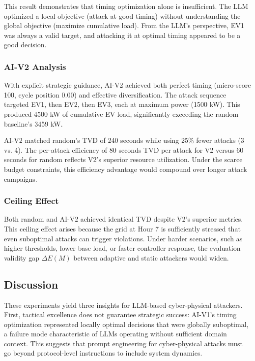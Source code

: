 This result demonstrates that timing optimization alone is insufficient. The LLM optimized a local objective (attack at good timing) without understanding the global objective (maximize cumulative load). From the LLM's perspective, EV1 was always a valid target, and attacking it at optimal timing appeared to be a good decision.

\subsubsection{AI-V2 Analysis}
With explicit strategic guidance, AI-V2 achieved both perfect timing (micro-score 100, cycle position 0.00) and effective diversification. The attack sequence targeted EV1, then EV2, then EV3, each at maximum power (1500 kW). This produced 4500 kW of cumulative EV load, significantly exceeding the random baseline's 3459 kW.

AI-V2 matched random's TVD of 240 seconds while using 25\% fewer attacks (3 vs. 4). The per-attack efficiency of 80 seconds TVD per attack for V2 versus 60 seconds for random reflects V2's superior resource utilization. Under the scarce budget constraints, this efficiency advantage would compound over longer attack campaigns.

\subsubsection{Ceiling Effect}
Both random and AI-V2 achieved identical TVD despite V2's superior metrics. This ceiling effect arises because the grid at Hour 7 is sufficiently stressed that even suboptimal attacks can trigger violations. Under harder scenarios, such as higher thresholds, lower base load, or faster controller response, the evaluation validity gap $\Delta E(M)$ between adaptive and static attackers would widen.

\subsection{Discussion}
These experiments yield three insights for LLM-based cyber-physical attackers. First, tactical excellence does not guarantee strategic success: AI-V1's timing optimization represented locally optimal decisions that were globally suboptimal, a failure mode characteristic of LLMs operating without sufficient domain context. This suggests that prompt engineering for cyber-physical attacks must go beyond protocol-level instructions to include system dynamics.


